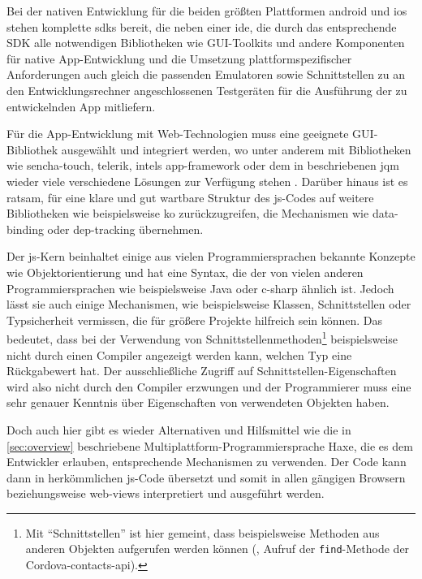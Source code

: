 Bei der nativen Entwicklung für die beiden größten Plattformen \gls{android} und \gls{ios} stehen komplette \glspl{sdk} bereit, die neben einer \gls{ide}, die durch das entsprechende SDK alle notwendigen Bibliotheken wie GUI-Toolkits und andere Komponenten für native App-Entwicklung und die Umsetzung plattformspezifischer Anforderungen auch gleich die passenden Emulatoren sowie Schnittstellen zu an den Entwicklungsrechner angeschlossenen Testgeräten für die Ausführung der zu entwickelnden App mitliefern.

Für die App-Entwicklung mit Web-Technologien muss eine geeignete GUI-Bibliothek ausgewählt und integriert werden, wo unter anderem mit Bibliotheken wie \gls{sencha-touch}, \gls{telerik}, \glspl{intel} \gls{app-framework} oder dem in  beschriebenen \gls{jqm} wieder viele verschiedene Lösungen zur Verfügung stehen \cite{sencha, telerik, IntelAppFramework, w3schools_jqm_start}.
Darüber hinaus ist es ratsam, für eine klare und gut wartbare Struktur des \gls{js}-Codes auf weitere Bibliotheken wie beispielsweise \gls{ko} zurückzugreifen, die Mechanismen wie \gls{data-binding} oder \gls{dep-tracking} übernehmen.

Der \gls{js}-Kern beinhaltet einige aus vielen Programmiersprachen bekannte Konzepte wie Objektorientierung und hat eine Syntax, die der von vielen anderen Programmiersprachen wie beispielsweise Java oder \gls{c-sharp} ähnlich ist.
Jedoch lässt sie auch einige Mechanismen, wie beispielsweise Klassen, Schnittstellen oder Typsicherheit vermissen, die \zB für größere Projekte hilfreich sein können. 
Das bedeutet, dass bei der Verwendung von Schnittstellenmethoden\footnote{Mit \enquote{Schnittstellen} ist hier gemeint, dass beispielsweise Methoden aus anderen Objekten aufgerufen werden können (, Aufruf der \lstinline|find|-Methode der Cordova-\gls{contacts-api}).} beispielsweise nicht durch einen Compiler angezeigt werden kann, welchen Typ eine Rückgabewert hat.
Der ausschließliche Zugriff auf Schnittstellen-Eigenschaften wird also nicht durch den Compiler erzwungen und der Programmierer muss eine sehr genauer Kenntnis über Eigenschaften von verwendeten Objekten haben.

Doch auch hier gibt es wieder Alternativen und Hilfsmittel wie \zB die in \autoref{sec:overview} beschriebene Multiplattform-Programmiersprache Haxe, die es dem Entwickler erlauben, entsprechende Mechanismen zu verwenden.
Der Code kann dann in herkömmlichen \gls{js}-Code übersetzt und somit in allen gängigen Browsern beziehungsweise \glspl{web-view} interpretiert und ausgeführt werden.

